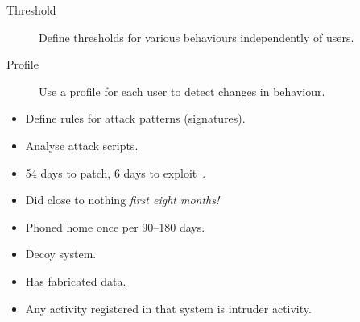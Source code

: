 \begin{frame}
  \begin{definition}
    \begin{description}
      \item[Threshold] Define thresholds for various behaviours independently 
        of users.

      \item[Profile] Use a profile for each user to detect changes in behaviour.
    \end{description}
  \end{definition}
\end{frame}

\begin{frame}
  \begin{definition}
    \begin{itemize}
      \item Define rules for attack patterns (signatures).
    \end{itemize}
  \end{definition}

  \begin{example}
    \begin{itemize}
      \item Analyse attack scripts.
    \end{itemize}
  \end{example}
\end{frame}

\begin{frame}
  \begin{example}
    \begin{itemize}
      \item 54 days to patch, 6 days to exploit~\cite{SecurityEconometrics}.
    \end{itemize}
  \end{example}

  \begin{example}
    \begin{itemize}
      \item Did close to nothing \emph{first eight months!}
      \item Phoned home once per 90--180 days.
    \end{itemize}
  \end{example}
\end{frame}

\begin{frame}
  \begin{definition}
    \begin{itemize}
      \item Decoy system.
      \item Has fabricated data.
      \item Any activity registered in that system is intruder activity.
    \end{itemize}
  \end{definition}
\end{frame}


